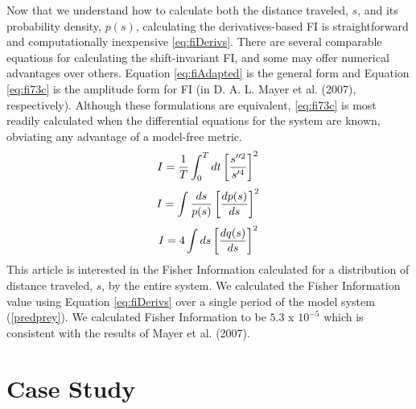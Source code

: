 \documentclass[12pt,twoside]{reedthesis}
\begin{document}
Now that we understand how to calculate both the distance traveled,
\(s\), and its probability density, \(p(s)\), calculating the
derivatives-based FI is straightforward and computationally inexpensive
\eqref{eq:fiDerivs}. There are several comparable equations for
calculating the shift-invariant FI, and some may offer numerical
advantages over others. Equation \eqref{eq:fiAdapted} is the general form
and Equation \eqref{eq:fi73c} is the amplitude form for FI (in D. A. L.
Mayer et al. (2007), respectively). Although these formulations are
equivalent, \eqref{eq:fi73c} is most readily calculated when the
differential equations for the system are known, obviating any advantage
of a model-free metric.
\begin{equation}   
    I = \frac{1}{T} \int_0^T dt\left[\frac{s''^2}{s'^4}\right]^2 \\  
  \label{eq:fiDerivs}  
\end{equation}
\begin{equation} 
    I = \int \frac{ds}{p(s)}\left[\frac{dp(s)}{ds}\right]^2  \\
    \label{eq:fiAdapted}
\end{equation}
\begin{equation} 
    I = 4 \int ds\left[\frac{dq(s)}{ds}\right]^2 \\
\label{eq:fi73c}
\end{equation}
This article is interested in the Fisher Information calculated for a
distribution of distance traveled, \(s\), by the entire system. We
calculated the Fisher Information value using Equation \eqref{eq:fiDerivs}
over a single period of the model system (\ref{predprey}). We calculated
Fisher Information to be \(5.3\) x \(10^{-5}\) which is consistent with
the results of Mayer et al. (2007).

\section{Case Study}\label{case-study}
\end{document}
